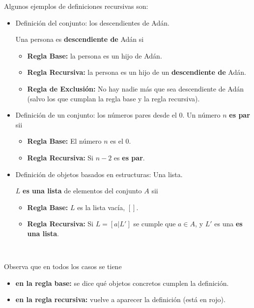 \begin{ejemplo}
Algunos ejemplos de definiciones recursivas son:
\begin{itemize}
\item Definición del conjunto: los descendientes de Adán.

Una persona es \textbf{\color{red} descendiente de} Adán si
	\begin{itemize}
	\item {\bf Regla Base:} la persona es un hijo de Adán.
	\item {\bf Regla Recursiva:} la persona es un hijo de un \textbf{\color{red} descendiente de} Adán.
	\item {\bf Regla de Exclusión:} No hay nadie más que sea descendiente de Adán (salvo los que cumplan la regla base y la regla recursiva).
	\end{itemize}

\item Definición de un conjunto: los números pares desde el $0$.
	Un número $n$ \textbf{\color{red} es par} sii
        \begin{itemize}
        \item {\bf Regla Base:} El número $n$ es el $0$.
        \item {\bf Regla Recursiva:} Si $n-2$ es  \textbf{\color{red} es par}.
        \end{itemize}

	
\item Definición de objetos basados en estructuras: Una lista.

$L$  \textbf{\color{red} es una lista} de elementos del conjunto $A$ sii
	\begin{itemize}
	\item {\bf Regla Base:} $L$ es la lista vacía, $[]$.
	\item {\bf Regla Recursiva:} Si $L=[a|L']$ se cumple que $a\in A$, y $L'$ es una \textbf{\color{red} es una lista}.
	\end{itemize}
\end{itemize}

\

Observa que en todos los casos se tiene 
\begin{itemize}
\item \textbf{en la regla base:} se dice qué objetos concretos cumplen la definición.
\item \textbf{en la regla recursiva:} vuelve a aparecer la definición (está en rojo).
\end{itemize}
\end{ejemplo}



